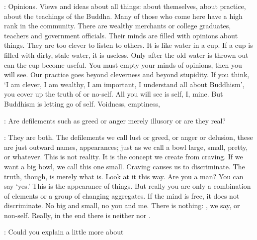 : Opinions. Views and ideas about all things: about themselves, about practice, about the teachings of the Buddha. Many of those who come here have a high rank in the community. There are wealthy merchants or college graduates, teachers and government officials. Their minds are filled with opinions about things. They are too clever to listen to others. It is like water in a cup. If a cup is filled with dirty, stale water, it is useless. Only after the old water is thrown out can the cup become useful. You must empty your minds of opinions, then you will see. Our practice goes beyond cleverness and beyond stupidity. If you think, `I am clever, I am wealthy, I am important, I understand all about Buddhism', you cover up the truth of  or no-self. All you will see is self, I, mine. But Buddhism is letting go of self. Voidness, emptiness, 

:
Are defilements such as greed or anger merely illusory or are they real?

: They are both. The defilements we call lust or greed, or anger or delusion, these are just outward names, appearances; just as we call a bowl large, small, pretty, or whatever. This is not reality. It is the concept we create from craving. If we want a big bowl, we call this one small. Craving causes us to discriminate. The truth, though, is merely what is. Look at it this way. Are you a man? You can say `yes.' This is the appearance of things. But really you are only a combination of elements or a group of changing aggregates. If the mind is free, it does not discriminate. No big and small, no you and me. There is nothing: , we say, or non-self. Really, in the end there is neither  nor .

:
Could you explain a little more about 

